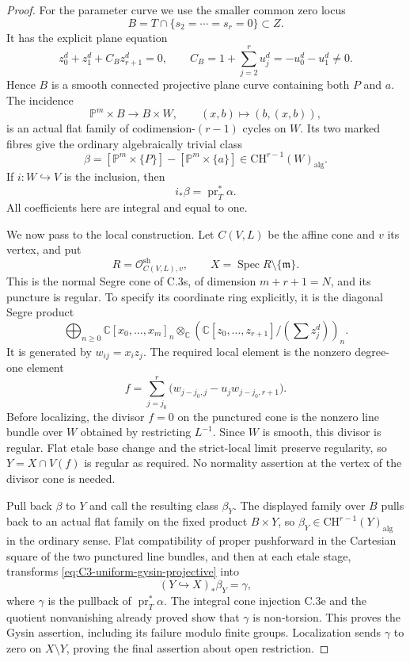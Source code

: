 \begin{proof}
For the parameter curve we use the smaller common zero locus
\[
       B=T\cap\{s_2=\cdots=s_r=0\}\subset Z.
\]
It has the explicit plane equation
\[
 z_0^d+z_1^d+C_Bz_{r+1}^d=0,\qquad
 C_B=1+\sum_{j=2}^{r}u_j^d=-u_0^d-u_1^d\ne0.
\]
Hence $B$ is a smooth connected projective plane curve containing
both $P$ and $a$. The incidence
\[
 \mathbb P^m\times B\longrightarrow B\times W,
               \qquad(x,b)\longmapsto(b,(x,b)),
\]
is an actual flat family of codimension-$(r-1)$ cycles on $W$.
Its two marked fibres give the ordinary algebraically trivial class
\[
 \beta=[\mathbb P^m\times\{P\}]
                   -[\mathbb P^m\times\{a\}]
                         \in\mathrm{CH}^{r-1}(W)_{\mathrm{alg}}.
\]
If $i:W\hookrightarrow V$ is the inclusion, then
\begin{equation}\label{eq:C3-uniform-gysin-projective}
                         i_*\beta=\operatorname{pr}_T^*\alpha.
\end{equation}
All coefficients here are integral and equal to one.

We now pass to the local construction. Let $C(V,L)$ be the affine
cone and $v$ its vertex, and put
\[
 R=\mathcal O_{C(V,L),v}^{\mathrm{sh}},\qquad
 X=\operatorname{Spec}R\setminus\{\mathfrak m\}.
\]
This is the normal Segre cone of C.3s, of dimension
$m+r+1=N$, and its puncture is regular. To specify its coordinate
ring explicitly, it is the diagonal Segre product
\[
 \bigoplus_{n\ge0}\mathbb C[x_0,\ldots,x_m]_n
   \otimes_{\mathbb C}
 \left(\mathbb C[z_0,\ldots,z_{r+1}]/
                         \left(\sum z_j^d\right)\right)_n.
\]
It is generated by $w_{ij}=x_i z_j$. The required local element is
the nonzero degree-one element
\begin{equation}\label{eq:C3-uniform-local-f}
             f=\sum_{j=j_0}^{r}
                 \bigl(w_{j-j_0,j}-u_jw_{j-j_0,r+1}\bigr).
\end{equation}
Before localizing, the divisor $f=0$ on the punctured cone is the
nonzero line bundle over $W$ obtained by restricting $L^{-1}$.
Since $W$ is smooth, this divisor is regular. Flat etale base change
and the strict-local limit preserve regularity, so
$Y=X\cap V(f)$ is regular as required. No normality assertion at the
vertex of the divisor cone is needed.

Pull back $\beta$ to $Y$ and call the resulting class $\beta_Y$.
The displayed family over $B$ pulls back to an actual flat family
on the fixed product $B\times Y$, so
$\beta_Y\in\mathrm{CH}^{r-1}(Y)_{\mathrm{alg}}$ in the ordinary
sense. Flat compatibility of proper pushforward in the Cartesian
square of the two punctured line bundles, and then at each etale
stage, transforms \eqref{eq:C3-uniform-gysin-projective} into
\[
                   (Y\hookrightarrow X)_*\beta_Y=\gamma,
\]
where $\gamma$ is the pullback of $\operatorname{pr}_T^*\alpha$.
The integral cone injection C.3e and the quotient nonvanishing
already proved show that $\gamma$ is non-torsion. This proves
the Gysin assertion, including its failure modulo finite groups.
Localization sends $\gamma$ to zero on $X\setminus Y$, proving
the final assertion about open restriction.
\end{proof}

